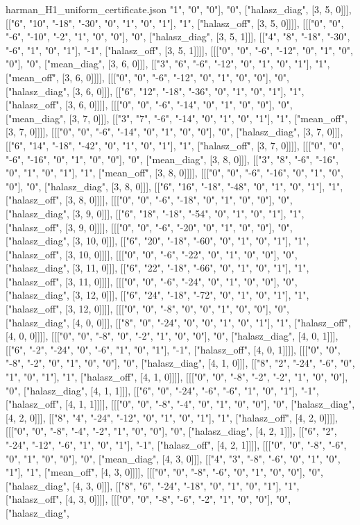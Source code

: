 \begin{filecontents*}[overwrite]{harman_H1_uniform_certificate.json}
"1", "0", "0"], "0", ["halasz_diag", [3, 5, 0]]], [["6", "10", "-18", "-30", "0", "1", "0", "1"], "1", ["halasz_off", [3, 5, 0]]]], [[["0", "0", "-6", "-10", "-2", "1", "0", "0"], "0", ["halasz_diag", [3, 5, 1]]], [["4", "8", "-18", "-30", "-6", "1", "0", "1"], "-1", ["halasz_off", [3, 5, 1]]]], [[["0", "0", "-6", "-12", "0", "1", "0", "0"], "0", ["mean_diag", [3, 6, 0]]], [["3", "6", "-6", "-12", "0", "1", "0", "1"], "1", ["mean_off", [3, 6, 0]]]], [[["0", "0", "-6", "-12", "0", "1", "0", "0"], "0", ["halasz_diag", [3, 6, 0]]], [["6", "12", "-18", "-36", "0", "1", "0", "1"], "1", ["halasz_off", [3, 6, 0]]]], [[["0", "0", "-6", "-14", "0", "1", "0", "0"], "0", ["mean_diag", [3, 7, 0]]], [["3", "7", "-6", "-14", "0", "1", "0", "1"], "1", ["mean_off", [3, 7, 0]]]], [[["0", "0", "-6", "-14", "0", "1", "0", "0"], "0", ["halasz_diag", [3, 7, 0]]], [["6", "14", "-18", "-42", "0", "1", "0", "1"], "1", ["halasz_off", [3, 7, 0]]]], [[["0", "0", "-6", "-16", "0", "1", "0", "0"], "0", ["mean_diag", [3, 8, 0]]], [["3", "8", "-6", "-16", "0", "1", "0", "1"], "1", ["mean_off", [3, 8, 0]]]], [[["0", "0", "-6", "-16", "0", "1", "0", "0"], "0", ["halasz_diag", [3, 8, 0]]], [["6", "16", "-18", "-48", "0", "1", "0", "1"], "1", ["halasz_off", [3, 8, 0]]]], [[["0", "0", "-6", "-18", "0", "1", "0", "0"], "0", ["halasz_diag", [3, 9, 0]]], [["6", "18", "-18", "-54", "0", "1", "0", "1"], "1", ["halasz_off", [3, 9, 0]]]], [[["0", "0", "-6", "-20", "0", "1", "0", "0"], "0", ["halasz_diag", [3, 10, 0]]], [["6", "20", "-18", "-60", "0", "1", "0", "1"], "1", ["halasz_off", [3, 10, 0]]]], [[["0", "0", "-6", "-22", "0", "1", "0", "0"], "0", ["halasz_diag", [3, 11, 0]]], [["6", "22", "-18", "-66", "0", "1", "0", "1"], "1", ["halasz_off", [3, 11, 0]]]], [[["0", "0", "-6", "-24", "0", "1", "0", "0"], "0", ["halasz_diag", [3, 12, 0]]], [["6", "24", "-18", "-72", "0", "1", "0", "1"], "1", ["halasz_off", [3, 12, 0]]]], [[["0", "0", "-8", "0", "0", "1", "0", "0"], "0", ["halasz_diag", [4, 0, 0]]], [["8", "0", "-24", "0", "0", "1", "0", "1"], "1", ["halasz_off", [4, 0, 0]]]], [[["0", "0", "-8", "0", "-2", "1", "0", "0"], "0", ["halasz_diag", [4, 0, 1]]], [["6", "-2", "-24", "0", "-6", "1", "0", "1"], "-1", ["halasz_off", [4, 0, 1]]]], [[["0", "0", "-8", "-2", "0", "1", "0", "0"], "0", ["halasz_diag", [4, 1, 0]]], [["8", "2", "-24", "-6", "0", "1", "0", "1"], "1", ["halasz_off", [4, 1, 0]]]], [[["0", "0", "-8", "-2", "-2", "1", "0", "0"], "0", ["halasz_diag", [4, 1, 1]]], [["6", "0", "-24", "-6", "-6", "1", "0", "1"], "-1", ["halasz_off", [4, 1, 1]]]], [[["0", "0", "-8", "-4", "0", "1", "0", "0"], "0", ["halasz_diag", [4, 2, 0]]], [["8", "4", "-24", "-12", "0", "1", "0", "1"], "1", ["halasz_off", [4, 2, 0]]]], [[["0", "0", "-8", "-4", "-2", "1", "0", "0"], "0", ["halasz_diag", [4, 2, 1]]], [["6", "2", "-24", "-12", "-6", "1", "0", "1"], "-1", ["halasz_off", [4, 2, 1]]]], [[["0", "0", "-8", "-6", "0", "1", "0", "0"], "0", ["mean_diag", [4, 3, 0]]], [["4", "3", "-8", "-6", "0", "1", "0", "1"], "1", ["mean_off", [4, 3, 0]]]], [[["0", "0", "-8", "-6", "0", "1", "0", "0"], "0", ["halasz_diag", [4, 3, 0]]], [["8", "6", "-24", "-18", "0", "1", "0", "1"], "1", ["halasz_off", [4, 3, 0]]]], [[["0", "0", "-8", "-6", "-2", "1", "0", "0"], "0", ["halasz_diag", 
\end{filecontents*}
